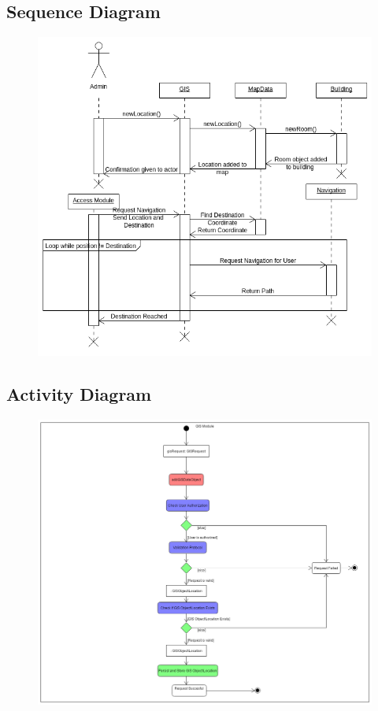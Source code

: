 \subsection{Sequence Diagram}
\begin{figure}[H]
	\includegraphics[width=\textwidth]{GIS/GIS_Sequence_Diagram.png}
\end{figure}


\subsection{Activity Diagram}
\begin{figure}[H]
	\includegraphics[width=\textwidth]{GIS/GIS_Activity-addGISObject.png}
\end{figure}

